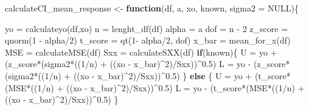 \documentclass[
]{article}
\newenvironment{Shaded}{\begin{snugshade}}{\end{snugshade}}
\newcommand{\AttributeTok}[1]{\textcolor[rgb]{0.77,0.63,0.00}{#1}}
\newcommand{\ConstantTok}[1]{\textcolor[rgb]{0.00,0.00,0.00}{#1}}
\newcommand{\ControlFlowTok}[1]{\textcolor[rgb]{0.13,0.29,0.53}{\textbf{#1}}}
\newcommand{\DecValTok}[1]{\textcolor[rgb]{0.00,0.00,0.81}{#1}}
\newcommand{\FloatTok}[1]{\textcolor[rgb]{0.00,0.00,0.81}{#1}}
\newcommand{\FunctionTok}[1]{\textcolor[rgb]{0.00,0.00,0.00}{#1}}
\newcommand{\NormalTok}[1]{#1}
\newcommand{\OtherTok}[1]{\textcolor[rgb]{0.56,0.35,0.01}{#1}}
\newcommand{\SpecialCharTok}[1]{\textcolor[rgb]{0.00,0.00,0.00}{#1}}
\begin{document}
\begin{Shaded}
\begin{Highlighting}[]
\NormalTok{calculateCI\_mean\_response }\OtherTok{\textless{}{-}} \ControlFlowTok{function}\NormalTok{(df, a, xo, known, }\AttributeTok{sigma2 =} \ConstantTok{NULL}\NormalTok{)\{}
  
\NormalTok{  yo }\OtherTok{=} \FunctionTok{calculateyo}\NormalTok{(df,xo)}
\NormalTok{  n }\OtherTok{=} \FunctionTok{lenght\_df}\NormalTok{(df)}
\NormalTok{  alpha }\OtherTok{=}\NormalTok{ a}
\NormalTok{  dof }\OtherTok{=}\NormalTok{ n }\SpecialCharTok{{-}} \DecValTok{2}
\NormalTok{  z\_score }\OtherTok{=} \FunctionTok{qnorm}\NormalTok{(}\DecValTok{1} \SpecialCharTok{{-}}\NormalTok{ alpha}\SpecialCharTok{/}\DecValTok{2}\NormalTok{)}
\NormalTok{  t\_score }\OtherTok{=} \FunctionTok{qt}\NormalTok{(}\DecValTok{1}\SpecialCharTok{{-}}\NormalTok{ alpha}\SpecialCharTok{/}\DecValTok{2}\NormalTok{, dof)}
\NormalTok{  x\_bar }\OtherTok{=} \FunctionTok{mean\_for\_x}\NormalTok{(df)}
\NormalTok{  MSE }\OtherTok{=} \FunctionTok{calculateMSE}\NormalTok{(df)}
\NormalTok{  Sxx }\OtherTok{=} \FunctionTok{calculateSXX}\NormalTok{(df)}
  \ControlFlowTok{if}\NormalTok{(known)\{}
\NormalTok{    U }\OtherTok{=}\NormalTok{ yo }\SpecialCharTok{+}\NormalTok{ (z\_score}\SpecialCharTok{*}\NormalTok{(sigma2}\SpecialCharTok{*}\NormalTok{((}\DecValTok{1}\SpecialCharTok{/}\NormalTok{n) }\SpecialCharTok{+}\NormalTok{ ((xo }\SpecialCharTok{{-}}\NormalTok{ x\_bar)}\SpecialCharTok{\^{}}\DecValTok{2}\NormalTok{)}\SpecialCharTok{/}\NormalTok{Sxx))}\SpecialCharTok{\^{}}\FloatTok{0.5}\NormalTok{)}
\NormalTok{    L }\OtherTok{=}\NormalTok{ yo }\SpecialCharTok{{-}}\NormalTok{ (z\_score}\SpecialCharTok{*}\NormalTok{(sigma2}\SpecialCharTok{*}\NormalTok{((}\DecValTok{1}\SpecialCharTok{/}\NormalTok{n) }\SpecialCharTok{+}\NormalTok{ ((xo }\SpecialCharTok{{-}}\NormalTok{ x\_bar)}\SpecialCharTok{\^{}}\DecValTok{2}\NormalTok{)}\SpecialCharTok{/}\NormalTok{Sxx))}\SpecialCharTok{\^{}}\FloatTok{0.5}\NormalTok{)}
\NormalTok{  \} }\ControlFlowTok{else}\NormalTok{ \{}
\NormalTok{    U }\OtherTok{=}\NormalTok{ yo }\SpecialCharTok{+}\NormalTok{ (t\_score}\SpecialCharTok{*}\NormalTok{(MSE}\SpecialCharTok{*}\NormalTok{((}\DecValTok{1}\SpecialCharTok{/}\NormalTok{n) }\SpecialCharTok{+}\NormalTok{ ((xo }\SpecialCharTok{{-}}\NormalTok{ x\_bar)}\SpecialCharTok{\^{}}\DecValTok{2}\NormalTok{)}\SpecialCharTok{/}\NormalTok{Sxx))}\SpecialCharTok{\^{}}\FloatTok{0.5}\NormalTok{)}
\NormalTok{    L }\OtherTok{=}\NormalTok{ yo }\SpecialCharTok{{-}}\NormalTok{ (t\_score}\SpecialCharTok{*}\NormalTok{(MSE}\SpecialCharTok{*}\NormalTok{((}\DecValTok{1}\SpecialCharTok{/}\NormalTok{n) }\SpecialCharTok{+}\NormalTok{ ((xo }\SpecialCharTok{{-}}\NormalTok{ x\_bar)}\SpecialCharTok{\^{}}\DecValTok{2}\NormalTok{)}\SpecialCharTok{/}\NormalTok{Sxx))}\SpecialCharTok{\^{}}\FloatTok{0.5}\NormalTok{)}
\NormalTok{  \}}
  

\end{Highlighting}
\end{Shaded}
\end{document}
